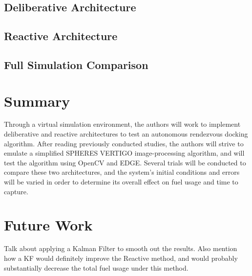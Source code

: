 \documentclass[journal, 10pt]{IEEEtran}
\begin{document}
\subsection{Deliberative Architecture}
\subsection{Reactive Architecture}
\subsection{Full Simulation Comparison}

\section{Summary}

Through a virtual simulation environment, the authors will work to implement deliberative and reactive architectures to test an autonomous rendezvous docking algorithm. After reading previously conducted studies, the authors will strive to emulate a simplified SPHERES VERTIGO image-processing algorithm, and will test the algorithm using OpenCV and EDGE. Several trials will be conducted to compare these two architectures, and the system's initial conditions and errors will be varied in order to determine its overall effect on fuel usage and time to capture.


\section{Future Work}
Talk about applying a Kalman Filter to smooth out the results. Also mention how a KF would definitely improve the Reactive method, and would probably substantially decrease the total fuel usage under this method.

\nocite{*}

{}
\end{document}
